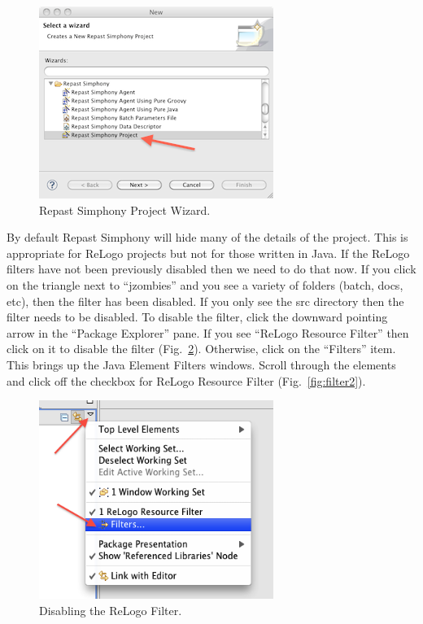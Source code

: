 \documentclass[11pt]{amsart}
\begin{document}
\begin{figure}[h]
\begin{center}
\vspace{.2in}
\centerline {
\includegraphics[width=3in]{GettingStartedImages/new_wizard.png}
}
\caption{Repast Simphony Project Wizard.}
\label{fig:newprojecticon}
\end{center}
\end{figure}

 By default Repast Simphony will hide many of the details of the project. This is appropriate for ReLogo projects but not for those written in Java. If the ReLogo filters have not been previously disabled then we need to do that now. If you click on the triangle next to ``jzombies'' and you see a variety of folders (batch, docs, etc), then the filter has been disabled. If you only see the src directory then the filter needs to be disabled. To disable the filter, click the downward pointing arrow in the ``Package Explorer'' pane. If you see ``ReLogo Resource Filter''  then click on it to disable the filter (Fig.~\ref{fig:filter}).  Otherwise, click on the ``Filters'' item. This brings up the Java Element Filters windows. Scroll through the elements and click off the checkbox for ReLogo Resource Filter (Fig.~\ref{fig:filter2}). 


\begin{figure}[h]
\begin{center}
\vspace{.2in}
\centerline {
\includegraphics[width=3in]{GettingStartedImages/filter.png}
}
\caption{Disabling the ReLogo Filter.}
\label{fig:filter}
\end{center}
\end{figure}
\end{document}
